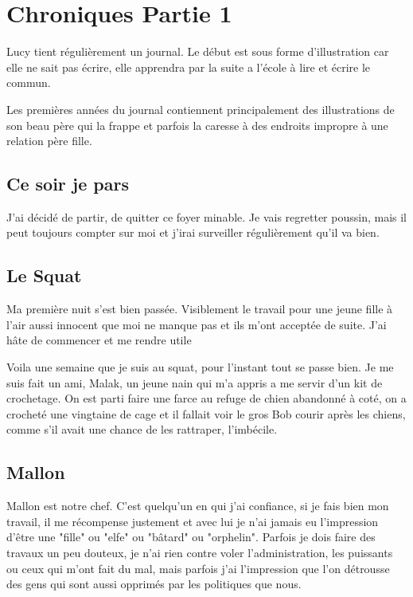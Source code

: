 \documentclass[10pt,a4paper,twoside,twocolumn,openany]{book}
\begin{document}
\vspace{2cm}

\chapter{Chroniques Partie 1}


\begin{quotebox}
Lucy tient régulièrement un journal. Le début est sous forme d'illustration car elle ne sait pas écrire, elle 
apprendra par la suite a l'école à lire et écrire le commun.

Les premières années du journal contiennent principalement des illustrations de son beau père qui la frappe et parfois la caresse à des 
endroits impropre à une relation père fille.
\end{quotebox}

\section{Ce soir je pars}

J'ai décidé de partir, de quitter ce foyer minable. Je vais regretter poussin, mais 
il peut toujours compter sur moi et j'irai surveiller régulièrement qu'il va bien.

\section{Le Squat}

Ma première nuit s'est bien passée. Visiblement le travail pour une jeune fille
à l'air aussi innocent que moi ne manque pas et ils m'ont acceptée de suite. J'ai
hâte de commencer et me rendre utile

Voila une semaine que je suis au squat, pour l'instant tout se passe bien. Je me 
suis fait un ami, Malak, un jeune nain qui m'a appris a me servir d'un kit de crochetage.
On est parti faire une farce au refuge de chien abandonné à coté, on a crocheté une vingtaine
de cage et il fallait voir le gros Bob courir après les chiens, comme s'il avait une chance de
les rattraper, l'imbécile.

\section{Mallon}
Mallon est notre chef. C'est quelqu'un en qui j'ai confiance, si je fais bien mon travail, il me
récompense justement et avec lui je n'ai jamais eu l'impression d'être une "fille" ou "elfe" ou
"bâtard" ou "orphelin". Parfois je dois faire des travaux un peu douteux, je n'ai rien contre voler
l'administration, les puissants ou ceux qui m'ont fait du mal, mais parfois j'ai l'impression que l'on
détrousse des gens qui sont aussi opprimés par les politiques que nous.
\end{document}
